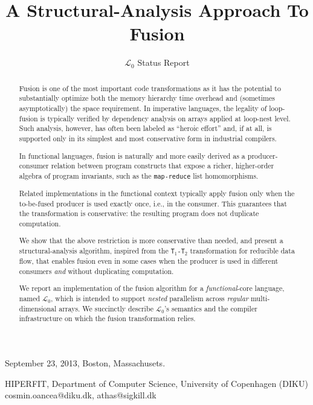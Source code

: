 \documentclass{sigplanconf}  %
\newcommand{\LO}{$\mathcal{L}_0$}
\newcommand{\comment}[2]{\textcolor{red}{\scriptsize \textsf \textbf{#1:}{#2}}}
\begin{document}
 {September 23, 2013, Boston, Massachusets.}


\title{A Structural-Analysis Approach To Fusion}
\subtitle{\LO{} Status Report}


           {HIPERFIT, Department of Computer Science, University of Copenhagen (DIKU)}
           {cosmin.oancea@diku.dk, athas@sigkill.dk}



\maketitle



\begin{abstract}

Fusion is one of the most important code transformations as it 
has the potential to substantially optimize both the memory hierarchy 
time overhead and (sometimes asymptotically) the space requirement.
%
In imperative languages, the legality of loop-fusion is typically 
verified by dependency analysis on arrays applied at loop-nest level.
Such analysis, however, has often been labeled as ``heroic effort''
and, if at all, is supported only in its simplest and most
conservative form in industrial compilers.  

In functional languages, fusion is naturally and more easily derived
as a producer-consumer relation between program constructs that expose
a richer, higher-order algebra of program invariants, 
such as the {\tt map-reduce} list homomorphisms. %

Related implementations in the functional context typically 
apply fusion only when the to-be-fused producer is used exactly once,
i.e., in the consumer.   This guarantees that the transformation is
conservative: the resulting program does not duplicate computation.

We show that the above restriction is more conservative than needed,
and present a structural-analysis algorithm, inspired
from the {\tt T$_1$-T$_2$} transformation for reducible data flow,
that enables fusion even in some cases when the producer is used 
in different consumers {\em and} without duplicating computation.  

We report an implementation of the fusion algorithm for a 
{\em functional}-core language, named \LO{}, which is intended 
to support {\em nested} parallelism across {\em regular} 
multi-dimensional arrays.  We succinctly describe \LO's
semantics and the compiler infrastructure on which the fusion
transformation relies.

\end{abstract}
\end{document}
